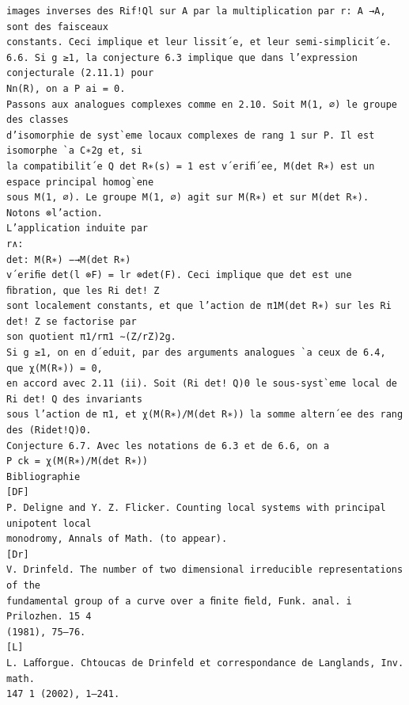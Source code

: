 \documentclass[11pt]{article}
\begin{document}
\begin{Verbatim}[breaklines=true,fontsize=\small]
images inverses des Rif!Ql sur A par la multiplication par r: A →A, sont des faisceaux
constants. Ceci implique et leur lissit´e, et leur semi-simplicit´e.
6.6. Si g ≥1, la conjecture 6.3 implique que dans l’expression conjecturale (2.11.1) pour
Nn(R), on a P ai = 0.
Passons aux analogues complexes comme en 2.10. Soit M(1, ∅) le groupe des classes
d’isomorphie de syst`eme locaux complexes de rang 1 sur P. Il est isomorphe `a C∗2g et, si
la compatibilit´e Q det R∗(s) = 1 est v´eriﬁ´ee, M(det R∗) est un espace principal homog`ene
sous M(1, ∅). Le groupe M(1, ∅) agit sur M(R∗) et sur M(det R∗). Notons ⊗l’action.
L’application induite par
r∧:
det: M(R∗) −→M(det R∗)
v´eriﬁe det(l ⊗F) = lr ⊗det(F). Ceci implique que det est une ﬁbration, que les Ri det! Z
sont localement constants, et que l’action de π1M(det R∗) sur les Ri det! Z se factorise par
son quotient π1/rπ1 ∼(Z/rZ)2g.
Si g ≥1, on en d´eduit, par des arguments analogues `a ceux de 6.4, que χ(M(R∗)) = 0,
en accord avec 2.11 (ii). Soit (Ri det! Q)0 le sous-syst`eme local de Ri det! Q des invariants
sous l’action de π1, et χ(M(R∗)/M(det R∗)) la somme altern´ee des rang des (Ridet!Q)0.
Conjecture 6.7. Avec les notations de 6.3 et de 6.6, on a
P ck = χ(M(R∗)/M(det R∗))
Bibliographie
[DF]
P. Deligne and Y. Z. Flicker. Counting local systems with principal unipotent local
monodromy, Annals of Math. (to appear).
[Dr]
V. Drinfeld. The number of two dimensional irreducible representations of the
fundamental group of a curve over a ﬁnite ﬁeld, Funk. anal. i Prilozhen. 15 4
(1981), 75–76.
[L]
L. Laﬀorgue. Chtoucas de Drinfeld et correspondance de Langlands, Inv. math.
147 1 (2002), 1–241.
\end{Verbatim}
\end{document}
